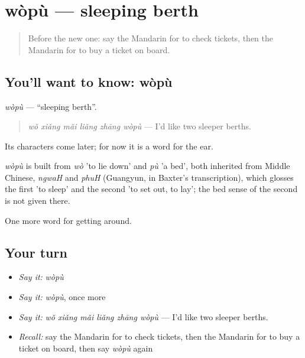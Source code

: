 \section[wòpù]{wòpù — sleeping berth}

\label{lesson:ZH-C404-wopu}



\begin{quote}
Before the new one: say the Mandarin for to check tickets, then the Mandarin for to buy a ticket on board.
\end{quote}

\subsection*{You'll want to know: wòpù}
\emph{wòpù} — \textquotedblleft{}sleeping berth\textquotedblright{}.

\begin{quote}
\emph{wǒ xiǎng mǎi liǎng zhāng wòpù} — I'd like two sleeper berths.
\end{quote}

Its characters come later; for now it is a word for the ear.

\begin{cousinweb}
\emph{wòpù} is built from \emph{wò} 'to lie down' and \emph{pù} 'a bed', both inherited from Middle Chinese, \emph{ngwaH} and \emph{phuH} (Guangyun, in Baxter's transcription), which glosses the first 'to sleep' and the second 'to set out, to lay'; the bed sense of the second is not given there.
\end{cousinweb}

\begin{grammarlens}[title={What you've built}]
One more word for getting around.
\end{grammarlens}

\subsection*{Your turn}
\begin{itemize}
\raggedright
  \item \emph{Say it:} \emph{wòpù}
  \item \emph{Say it:} \emph{wòpù}, once more
  \item \emph{Say it:} \emph{wǒ xiǎng mǎi liǎng zhāng wòpù} — I'd like two sleeper berths.
  \item \emph{Recall:} say the Mandarin for to check tickets, then the Mandarin for to buy a ticket on board, then say \emph{wòpù} again
\end{itemize}


